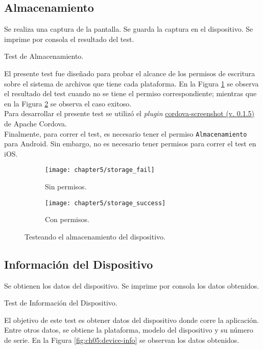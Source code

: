 \subsection{Almacenamiento}
\begin{algorithm}
	\begin{algorithmic}[1]
		\STATE Se realiza una captura de la pantalla.
		\STATE Se guarda la captura en el dispositivo.
		\STATE Se imprime por consola el resultado del test.
	\end{algorithmic}
	\caption{Test de Almacenamiento.}\label{alg:chap5_test_storage}
\end{algorithm}
El presente test fue diseñado para probar el alcance de los permisos de escritura sobre el sistema de archivos que tiene cada plataforma. En la Figura \ref{fig:ch05:storage_fail} se observa el resultado del test cuando no se tiene el permiso correspondiente; mientras que en la Figura \ref{fig:ch05:storage_success} se observa el caso exitoso.\\

Para desarrollar el presente test se utilizó el \textit{plugin} \href{https://github.com/gitawego/cordova-screenshot}{cordova-screenshot (v. 0.1.5)} de Apache Cordova.\\

Finalmente, para correr el test, es necesario tener el permiso \texttt{Almacenamiento} para Android. Sin embargo, no es necesario tener permisos para correr el test en iOS.
\begin{figure}[hbtp]
   \centering
   	\begin{subfigure}{.3\linewidth}
		\texttt{[image: chapter5/storage\_fail]}
		\caption{Sin permisos.}
		\label{fig:ch05:storage_fail}
	\end{subfigure}
	\begin{subfigure}{.3\linewidth}
		\texttt{[image: chapter5/storage\_success]}
		\caption{Con permisos.}
		\label{fig:ch05:storage_success}
	\end{subfigure}
	\caption{Testeando el almacenamiento del dispositivo.}
	\label{fig:ch05:storage_test}
\end{figure}
\subsection{Información del Dispositivo}
\begin{algorithm}
	\begin{algorithmic}[1]
		\STATE Se obtienen los datos del dispositivo.
		\STATE Se imprime por consola los datos obtenidos.
	\end{algorithmic}
	\caption{Test de Información del Dispositivo.}\label{alg:chap5_test_info}
\end{algorithm}
El objetivo de este test es obtener datos del dispositivo donde corre la aplicación. Entre otros datos, se obtiene la plataforma, modelo del dispositivo y su número de serie. En la Figura \ref{fig:ch05:device-info} se observan los datos obtenidos.\\

